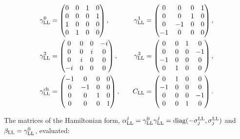 \documentclass[
  10pt,
]{article}
\begin{document}
\[\begin{aligned}\gamma^0_{\rm LL}&=\begin{pmatrix}0&0&1&0\\0&0&0&1\\1&0&0&0\\0&1&0&0\end{pmatrix},&\gamma^1_{\rm LL}&=\begin{pmatrix}0&0&0&1\\0&0&1&0\\0&-1&0&0\\-1&0&0&0\end{pmatrix},\\ \gamma^2_{\rm LL}&=\begin{pmatrix}0&0&0&-i\\0&0&i&0\\0&i&0&0\\-i&0&0&0\end{pmatrix},&\gamma^3_{\rm LL}&=\begin{pmatrix}0&0&1&0\\0&0&0&-1\\-1&0&0&0\\0&1&0&0\end{pmatrix},\\ \gamma^{\rm ch}_{\rm LL}&=\begin{pmatrix}-1&0&0&0\\0&-1&0&0\\0&0&1&0\\0&0&0&1\end{pmatrix},&\quad C_{\rm LL}&=\begin{pmatrix}0&1&0&0\\-1&0&0&0\\0&0&0&-1\\0&0&1&0\end{pmatrix}.\end{aligned}\]

The matrices of the Hamiltonian form,
\(\alpha^j_{\rm LL}=\gamma^0_{\rm LL}\gamma^j_{\rm LL}=\mathrm{diag}(-\sigma^{\rm LL}_j,\sigma^{\rm LL}_j)\)
and \(\beta_{\rm LL}=\gamma^0_{\rm LL}\), evaluated:
\end{document}
